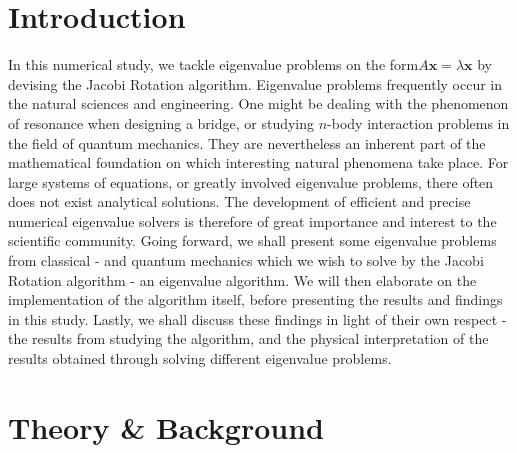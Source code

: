 	\section{Introduction}
	In this numerical study, we tackle eigenvalue problems on the form\newline $\displaystyle A\mathbf{x} = \lambda\mathbf{x}$ by devising the Jacobi Rotation algorithm. Eigenvalue problems frequently occur in the natural sciences and engineering. One might be dealing with the phenomenon of resonance when designing a bridge, or studying $n$-body interaction problems in the field of quantum mechanics. They are nevertheless an inherent part of the mathematical foundation on which interesting natural phenomena take place. For large systems of equations, or greatly involved eigenvalue problems, there often does not exist analytical solutions. The development of efficient and precise numerical eigenvalue solvers is therefore of great importance and interest to the scientific community. Going forward, we shall present some eigenvalue problems from classical - and quantum mechanics which we wish to solve by the Jacobi Rotation algorithm - an eigenvalue algorithm. We will then elaborate on the implementation of the algorithm itself, before presenting the results and findings in this study. Lastly, we shall discuss these findings in light of their own respect - the results from studying the algorithm, and the physical interpretation of the results obtained through solving different eigenvalue problems.
	\newpage
	\section{Theory \& Background}
